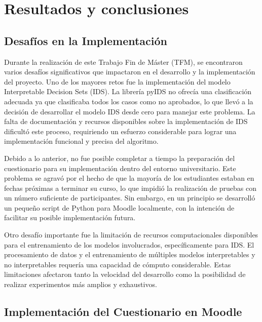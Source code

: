 \chapter{Resultados y conclusiones}

\section{Desafíos en la Implementación}

Durante la realización de este Trabajo Fin de Máster (TFM), se encontraron varios desafíos significativos que impactaron en el desarrollo y la implementación del proyecto. Uno de los mayores retos fue la implementación del modelo Interpretable Decision Sets (IDS). La librería pyIDS no ofrecía una clasificación adecuada ya que clasificaba todos los casos como no aprobados, lo que llevó a la decisión de desarrollar el modelo IDS desde cero para manejar este problema. La falta de documentación y recursos disponibles sobre la implementación de IDS dificultó este proceso, requiriendo un esfuerzo considerable para lograr una implementación funcional y precisa del algoritmo.

Debido a lo anterior, no fue posible completar a tiempo la preparación del cuestionario para su implementación dentro del entorno universitario. Este problema se agravó por el hecho de que la mayoría de los estudiantes estaban en fechas próximas a terminar su curso, lo que impidió la realización de pruebas con un número suficiente de participantes. Sin embargo, en un principio se desarrolló un pequeño script de Python para Moodle localmente, con la intención de facilitar su posible implementación futura.

Otro desafío importante fue la limitación de recursos computacionales disponibles para el entrenamiento de los modelos involucrados, específicamente para IDS. El procesamiento de datos y el entrenamiento de múltiples modelos interpretables y no interpretables requería una capacidad de cómputo considerable. Estas limitaciones afectaron tanto la velocidad del desarrollo como la posibilidad de realizar experimentos más amplios y exhaustivos.

\section{Implementación del Cuestionario en Moodle}

